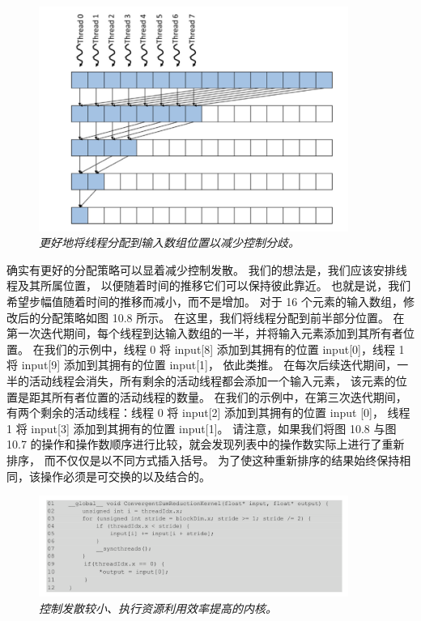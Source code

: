 \begin{figure}[H]
	\centering
	\includegraphics[width=0.9\textwidth]{figs/F10.8.png}
	\caption{\textit{更好地将线程分配到输入数组位置以减少控制分歧。}}
\end{figure}

确实有更好的分配策略可以显着减少控制发散。 我们的想法是，我们应该安排线程及其所属位置，
以便随着时间的推移它们可以保持彼此靠近。 也就是说，我们希望步幅值随着时间的推移而减小，而不是增加。 
对于 16 个元素的输入数组，修改后的分配策略如图 10.8 所示。 在这里，我们将线程分配到前半部分位置。 
在第一次迭代期间，每个线程到达输入数组的一半，并将输入元素添加到其所有者位置。 
在我们的示例中，线程 0 将 input[8] 添加到其拥有的位置 input[0]，线程 1 将 input[9] 添加到其拥有的位置 input[1]，
依此类推。 在每次后续迭代期间，一半的活动线程会消失，所有剩余的活动线程都会添加一个输入元素，
该元素的位置是距其所有者位置的活动线程的数量。 
在我们的示例中，在第三次迭代期间，有两个剩余的活动线程：线程 0 将 input[2] 添加到其拥有的位置 input [0]，
线程 1 将 input[3] 添加到其拥有的位置 input[1]。 
请注意，如果我们将图 10.8 与图 10.7 的操作和操作数顺序进行比较，就会发现列表中的操作数实际上进行了重新排序，
而不仅仅是以不同方式插入括号。 为了使这种重新排序的结果始终保持相同，该操作必须是可交换的以及结合的。

\begin{figure}[H]
	\centering
	\includegraphics[width=0.9\textwidth]{figs/F10.9.png}
	\caption{\textit{控制发散较小、执行资源利用效率提高的内核。}}
\end{figure}

